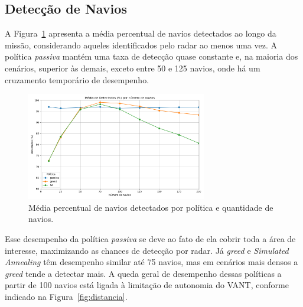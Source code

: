 
\subsection{Detecção de Navios}

A Figura~\ref{fig:detectados} apresenta a média percentual de navios detectados ao longo da missão, considerando aqueles identificados pelo radar ao menos uma vez. A política \textit{passiva} mantém uma taxa de detecção quase constante e, na maioria dos cenários, superior às demais, exceto entre 50 e 125 navios, onde há um cruzamento temporário de desempenho.

\begin{figure}[H]
    \centering
    \includegraphics[width=0.7\textwidth]{fig/resultado_det.png}
    \caption{Média percentual de navios detectados por política e quantidade de navios.}
    \label{fig:detectados}
\end{figure}

Esse desempenho da política \textit{passiva} se deve ao fato de ela cobrir toda a área de interesse, maximizando as chances de detecção por radar. Já \textit{greed} e \textit{Simulated Annealing} têm desempenho similar até 75 navios, mas em cenários mais densos a \textit{greed} tende a detectar mais. A queda geral de desempenho dessas políticas a partir de 100 navios está ligada à limitação de autonomia do VANT, conforme indicado na Figura~\ref{fig:distancia}.


